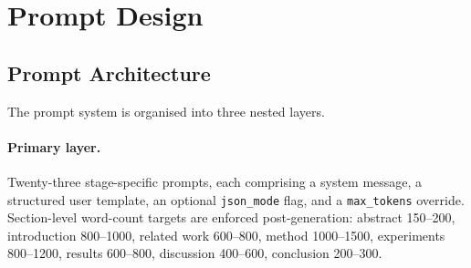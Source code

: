 

\section{Prompt Design}
\label{app:prompts}

\subsection{Prompt Architecture}
\label{app:prompt-arch}

The prompt system is organised into three nested layers.

\paragraph{Primary layer.}
Twenty-three stage-specific prompts, each comprising a system message, a structured user template, an optional \texttt{json\_mode} flag, and a \texttt{max\_tokens} override.
Section-level word-count targets are enforced post-generation: abstract 150--200, introduction 800--1000, related work 600--800, method 1000--1500, experiments 800--1200, results 600--800, discussion 400--600, conclusion 200--300.

